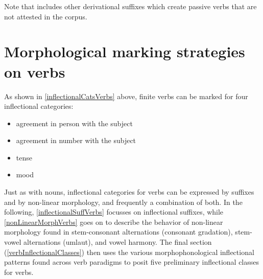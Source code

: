 \enlargethispage{2\baselineskip}
Note that \citet{Ruong1945} includes other derivational suffixes which create passive verbs that are not attested in the corpus. 


\section{Morphological marking strategies on verbs}\label{markingVerbs}
As shown in \SEC\ref{inflectionalCatsVerbs} above, finite verbs can be marked for four inflectional categories: 
\begin{itemize}
\item{agreement in person with the subject}
\item{agreement in number with the subject}
\item{tense}
\item{mood}
\end{itemize}
Just as with nouns, inflectional categories for verbs can be expressed by suffixes and by non-linear morphology, and frequently a combination of both. In the following, \SEC\ref{inflectionalSuffVerbs} focusses on inflectional suffixes, while \SEC\ref{nonLinearMorphVerbs} goes on to describe the behavior of non-linear morphology found in stem-consonant alternations (consonant gradation), stem-vowel alternations (umlaut), %
and vowel harmony. The final section (\ref{verbInflectionalClasses}) then uses the various morphophonological inflectional patterns found across verb paradigms to posit five preliminary inflectional classes for verbs.

\newcommand{\Xp}[1]{\MC{1}{x{80pt}}{#1}}%

